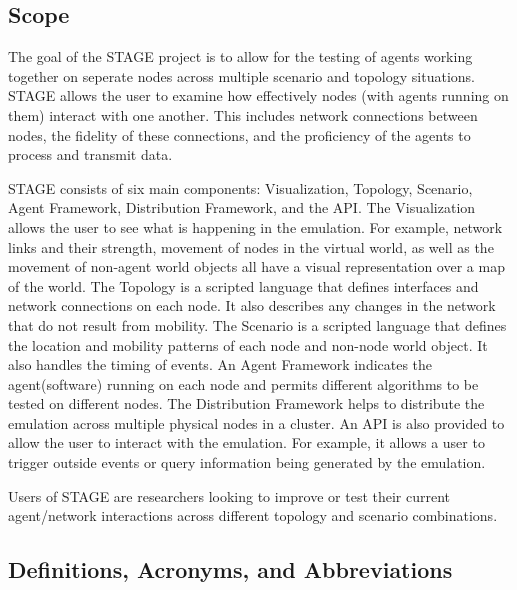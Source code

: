 \documentclass[titlepage]{article}
\begin{document}

\subsection{Scope%
  \label{scope}%
}

The goal of the STAGE project is to allow for the testing of agents working together on seperate nodes across multiple scenario and topology situations.  STAGE allows the user to examine how effectively nodes (with agents running on them) interact with one another.  This includes network connections between nodes, the fidelity of these connections, and the proficiency of the agents to process and transmit data.

STAGE consists of six main components: Visualization, Topology, Scenario, Agent Framework, Distribution Framework, and the API.  The Visualization allows the user to see what is happening in the emulation.  For example, network links and their strength, movement of nodes in the virtual world, as well as the movement of non-agent world objects all have a visual representation over a map of the world.  The Topology is a scripted language that defines interfaces and network connections on each node.  It also describes any changes in the network that do not result from mobility.  The Scenario is a scripted language that defines the location and mobility patterns of each node and non-node world object. It also handles the timing of events. An Agent Framework indicates the agent(software) running on each node and permits different algorithms to be tested on different nodes.  The Distribution Framework helps to distribute the emulation across multiple physical nodes in a cluster.  An API is also provided to allow the user to interact with the emulation.  For example, it allows a user to trigger outside events or query information being generated by the emulation. 

Users of STAGE are researchers looking to improve or test their current agent/network interactions across different topology and scenario combinations.  

\subsection{Definitions, Acronyms, and Abbreviations%
  \label{definitions}%
}
\end{document}
